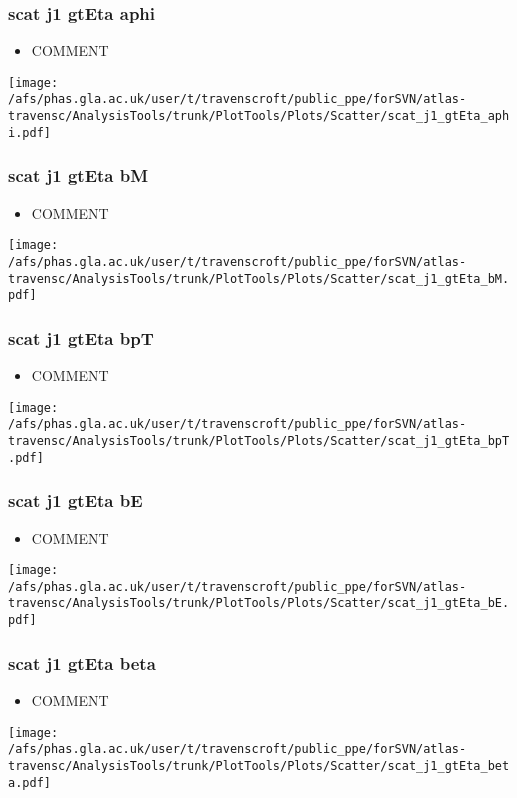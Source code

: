 \documentclass{beamer}
\begin{document}
\begin{frame}
\frametitle{scat j1 gtEta aphi}
\begin{itemize}
\item COMMENT
\end{itemize}
\begin{center}
\texttt{[image: /afs/phas.gla.ac.uk/user/t/travenscroft/public\_ppe/forSVN/atlas-travensc/AnalysisTools/trunk/PlotTools/Plots/Scatter/scat\_j1\_gtEta\_aphi.pdf]}
\end{center}
\end{frame}

\begin{frame}
\frametitle{scat j1 gtEta bM}
\begin{itemize}
\item COMMENT
\end{itemize}
\begin{center}
\texttt{[image: /afs/phas.gla.ac.uk/user/t/travenscroft/public\_ppe/forSVN/atlas-travensc/AnalysisTools/trunk/PlotTools/Plots/Scatter/scat\_j1\_gtEta\_bM.pdf]}
\end{center}
\end{frame}

\begin{frame}
\frametitle{scat j1 gtEta bpT}
\begin{itemize}
\item COMMENT
\end{itemize}
\begin{center}
\texttt{[image: /afs/phas.gla.ac.uk/user/t/travenscroft/public\_ppe/forSVN/atlas-travensc/AnalysisTools/trunk/PlotTools/Plots/Scatter/scat\_j1\_gtEta\_bpT.pdf]}
\end{center}
\end{frame}

\begin{frame}
\frametitle{scat j1 gtEta bE}
\begin{itemize}
\item COMMENT
\end{itemize}
\begin{center}
\texttt{[image: /afs/phas.gla.ac.uk/user/t/travenscroft/public\_ppe/forSVN/atlas-travensc/AnalysisTools/trunk/PlotTools/Plots/Scatter/scat\_j1\_gtEta\_bE.pdf]}
\end{center}
\end{frame}

\begin{frame}
\frametitle{scat j1 gtEta beta}
\begin{itemize}
\item COMMENT
\end{itemize}
\begin{center}
\texttt{[image: /afs/phas.gla.ac.uk/user/t/travenscroft/public\_ppe/forSVN/atlas-travensc/AnalysisTools/trunk/PlotTools/Plots/Scatter/scat\_j1\_gtEta\_beta.pdf]}
\end{center}
\end{frame}
\end{document}

